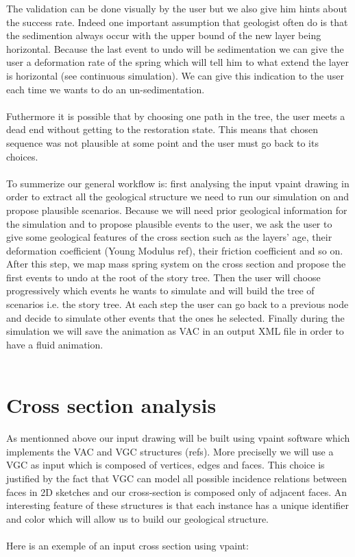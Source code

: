 \documentclass[12pt, a4paper]{memoir} %
\begin{document}
The validation can be done visually by the user but we also give him hints about the success rate. Indeed one important assumption that geologist often do is that the sedimention always occur with the upper bound of the new layer being horizontal. Because the last event to undo will be sedimentation we can give the user a deformation rate of the spring which will tell him to what extend the layer is horizontal (see continuous simulation). We can give this indication to the user each time we wants to do an un-sedimentation.\\\\
Futhermore it is possible that by choosing one path in the tree, the user meets a dead end without getting to the restoration state. This means that chosen sequence was not plausible at some point and the user must go back to its choices.\\\\
To summerize our general workflow is: first analysing the input vpaint drawing in order to extract all the geological structure we need to run our simulation on and propose plausible scenarios. Because we will need prior geological information for the simulation and to propose plausible events to the user, we ask the user to give some geological features of the cross section such as the layers' age, their deformation coefficient (Young Modulus ref), their friction coefficient and so on.\\ 
After this step, we map mass spring system on the cross section and propose the first events to undo at the root of the story tree. 
Then the user will choose progressively which events he wants to simulate and will build the tree of scenarios i.e. the story tree. At each step the user can go back to a previous node and decide to simulate other events that the ones he selected.
Finally during the simulation we will save the animation as VAC in an output XML file in order to have a fluid animation.\\\\

\chapter{Cross section analysis}

As mentionned above our input drawing will be built using vpaint software which implements the VAC and VGC structures (refs).
More preciselly we will use a VGC as input which is composed of vertices, edges and faces. This choice is justified by the fact that VGC can model all possible incidence relations between faces in 2D sketches and our cross-section is composed only of adjacent faces. An interesting feature of these structures is that each instance has a unique identifier and color which will allow us to build our geological structure.\\\\
Here is an exemple of an input cross section using vpaint:
\end{document}
